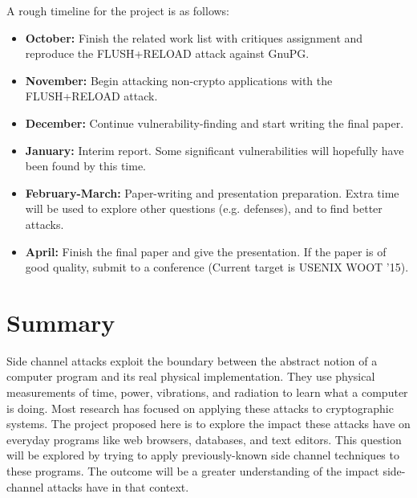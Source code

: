 \documentclass{acm_proc_article-sp}
\begin{document}
A rough timeline for the project is as follows:

\begin{itemize}
    \item \textbf{October:} Finish the related work list with critiques assignment and
          reproduce the FLUSH+RELOAD attack against GnuPG.
      \item \textbf{November:} Begin attacking non-crypto applications with the
          FLUSH+RELOAD attack.
      \item \textbf{December:} Continue vulnerability-finding and start writing
          the final paper.
      \item \textbf{January:} Interim report. Some significant vulnerabilities
          will hopefully have been found by this time.
      \item \textbf{February-March:} Paper-writing and presentation preparation. Extra time
          will be used to explore other questions (e.g. defenses), and to find
          better attacks.
      \item \textbf{April:} Finish the final paper and give the presentation. If
          the paper is of good quality, submit to a conference (Current target
          is USENIX WOOT '15).
\end{itemize}

\section{Summary}
\label{sec:conclusion}

Side channel attacks exploit the boundary between the abstract notion of
a computer program and its real physical implementation. They use physical
measurements of time, power, vibrations, and radiation to learn what a computer
is doing. Most research has focused on applying these attacks to cryptographic
systems. The project proposed here is to explore the impact these attacks have
on everyday programs like web browsers, databases, and text editors. This
question will be explored by trying to apply previously-known side channel
techniques to these programs. The outcome will be a greater understanding of the
impact side-channel attacks have in that context.



\end{document}
